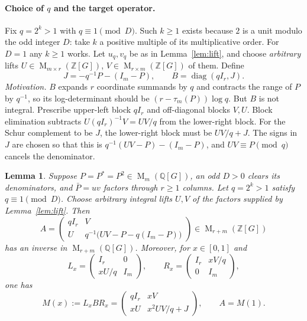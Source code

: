 \documentclass[11pt]{article}
\newtheorem{lemma}[theorem]{Lemma}
\theoremstyle{remark}
\numberwithin{equation}{section}
\newcommand{\Z}{\mathbb Z}
\newcommand{\Q}{\mathbb Q}
\newcommand{\Mat}{\operatorname{M}}
\newcommand{\diag}{\operatorname{diag}}
\begin{document}
\paragraph{Choice of $q$ and the target operator.}
Fix $q=2^k>1$ with $q\equiv1\pmod D$. Such $k\ge1$ exists because $2$ is a unit modulo the odd integer $D$: take $k$ a positive multiple of its multiplicative order. For $D=1$ any $k\ge1$ works. Let $u_q,v_q$ be as in Lemma~\ref{lem:lift}, and choose \emph{arbitrary} lifts $U\in\Mat_{m\times r}(\Z[G])$, $V\in\Mat_{r\times m}(\Z[G])$ of them. Define
\[
 J=-q^{-1}P-(I_m-P),\qquad B=\diag(qI_r,J).
\]
\emph{Motivation.} $B$ expands $r$ coordinate summands by $q$ and contracts the range of $P$ by $q^{-1}$, so its log-determinant should be $(r-\tau_m(P))\log q$. But $B$ is not integral. Prescribe upper-left block $qI_r$ and off-diagonal blocks $V,U$. Block elimination subtracts $U(qI_r)^{-1}V=UV/q$ from the lower-right block. For the Schur complement to be $J$, the lower-right block must be $UV/q+J$. The signs in $J$ are chosen so that this is $q^{-1}(UV-P)-(I_m-P)$, and $UV\equiv P\pmod q$ cancels the denominator.

\begin{lemma}\label{lem:integral}
Suppose $P=P^*=P^2\in\Mat_m(\Q[G])$, an odd $D>0$ clears its
denominators, and $\bar P=uv$ factors through $r\ge1$ columns.
Let $q=2^k>1$ satisfy $q\equiv1\pmod D$. Choose arbitrary
integral lifts $U,V$ of the factors supplied by Lemma~\ref{lem:lift}.
Then
\begin{equation}\label{eq:integral-matrix}
 A=\begin{pmatrix}
 qI_r&V\\
 U&q^{-1}\bigl(UV-P-q(I_m-P)\bigr)
 \end{pmatrix}
 \in\Mat_{r+m}(\Z[G])
\end{equation}
has an inverse in $\Mat_{r+m}(\Q[G])$. Moreover, for $x\in[0,1]$ and
\[
 L_x=\begin{pmatrix}I_r&0\\xU/q&I_m\end{pmatrix},\qquad
 R_x=\begin{pmatrix}I_r&xV/q\\0&I_m\end{pmatrix},
\]
one has
\begin{equation}\label{eq:path}
 M(x):=L_xBR_x=
 \begin{pmatrix}qI_r&xV\\xU&x^2UV/q+J\end{pmatrix},
 \qquad A=M(1).
\end{equation}
\end{lemma}
\end{document}
